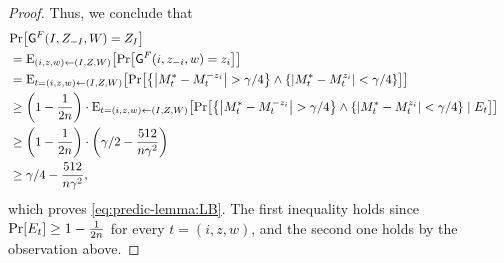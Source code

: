 \begin{proof}
	Thus, we conclude that
	\begin{align*}
		\lefteqn{\pr{\Gc^F(I,Z_{-I},W) = Z_I}}\\
		&= \eex{(i,z,w) \la (I,Z,W)}{\pr{\Gc^F(i,z_{-i},w) = z_i}}\\
		&= \eex{t = (i,z,w) \la (I,Z,W)}{\pr{\set{\size{M_t^* - M_t^{-z_i}} > \gamma/4} \land \set{\size{M_t^* - M_t^{z_i}} < \gamma/4}}}\\
		&\geq \paren{1 - \frac1{2n}}\cdot \eex{t = (i,z,w) \la (I,Z,W)}{\pr{\set{\size{M_t^* - M_t^{-z_i}} > \gamma/4} \land \set{\size{M_t^* - M_t^{z_i}} < \gamma/4} \mid E_t}}\\
		&\geq \paren{1 - \frac1{2n}}\cdot \paren{\gamma/2 - \frac{512}{n \gamma^2}}\\
		&\geq \gamma/4 - \frac{512}{n \gamma^2},
	\end{align*}
	which proves \cref{eq:predic-lemma:LB}. The first inequality holds since $\pr{E_t} \geq 1-\frac1{2n}$ for every $t = (i,z,w)$, and the second one holds by the observation above.
	
\end{proof}